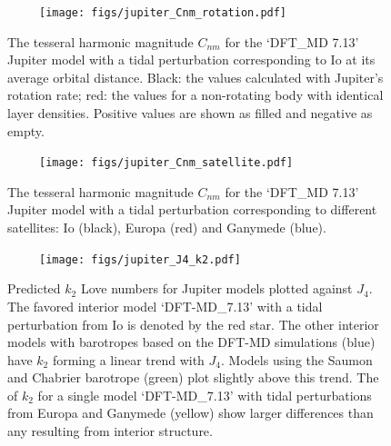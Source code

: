 \begin{figure}[h!]  
  \centering
    \texttt{[image: figs/jupiter\_Cnm\_rotation.pdf]}
\caption{ The tesseral harmonic magnitude $C_{nm}$ for the `DFT\_MD 7.13' Jupiter
model with a tidal perturbation corresponding to Io at its average orbital distance.
Black: the values calculated with Jupiter's rotation rate; red: the values for
a non-rotating body with identical layer densities.  Positive values are shown as
filled and negative as empty.}
\label{fig:tesseral_rotation}
\end{figure}

\begin{figure}[h!]  
  \centering
    \texttt{[image: figs/jupiter\_Cnm\_satellite.pdf]}
\caption{ The tesseral harmonic magnitude $C_{nm}$ for the `DFT\_MD 7.13' Jupiter
model with a tidal perturbation corresponding to different satellites: Io (black),
Europa (red) and Ganymede (blue).}
\label{fig:tesseral_satellites}
\end{figure}

\begin{figure}[h!]  
  \centering
    \texttt{[image: figs/jupiter\_J4\_k2.pdf]}
\caption{ Predicted $k_2$ Love numbers for Jupiter models plotted against $J_4$. The
    favored interior model `DFT-MD\_7.13' with a tidal perturbation from Io is
    denoted by the red star. The other interior models with barotropes based on the
    DFT-MD simulations (blue) have $k_2$ forming a linear trend with $J_4$.  Models
    using the Saumon and Chabrier barotrope (green) plot slightly above this trend.
    The of $k_2$ for a single model `DFT-MD\_7.13' with tidal perturbations from
    Europa and Ganymede (yellow) show larger differences than any resulting from
    interior structure.
    \label{fig:J4_k2}}
\end{figure}

